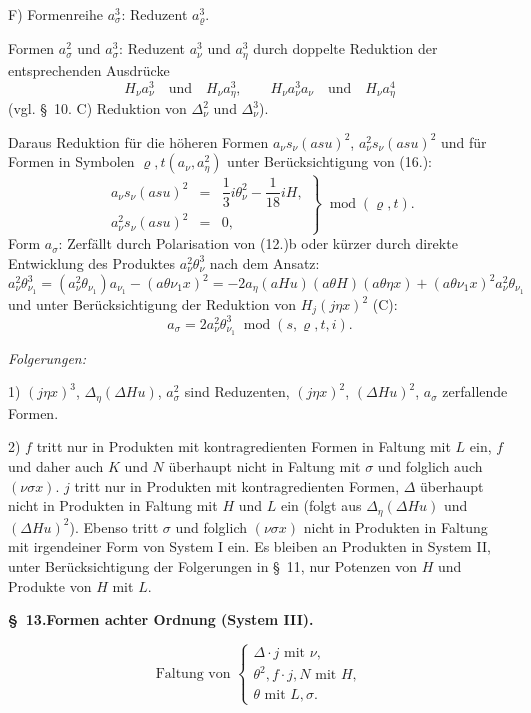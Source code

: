 \documentclass[11pt]{article}
\newcommand{\A}{\Delta}
\newcommand{\R}{\varrho}
\newcommand{\modu}[1]{\;\operatorname{mod} #1}
\begin{document}
\noindent F) Formenreihe $a_\sigma^3$: Reduzent $a_\R^3$.

Formen $a_\sigma^2$ und $a_\sigma^3$: Reduzent $a_\nu^3$ und $a_\eta^3$ durch doppelte Reduktion der entsprechenden Ausdrücke
\[
H_\nu a_\nu^3\quad\text{und}\quad H_\nu a_\eta^3,
\qquad
H_\nu a_\nu^3a_\nu\quad\text{und}\quad H_\nu a_\eta^4
\]
(vgl. \S\ 10. C) Reduktion von $\A_\nu^2$ und $\A_\nu^3$).

Daraus Reduktion für die höheren Formen $a_\nu s_\nu(asu)^2$, $a_\nu^2s_\nu(asu)^2$ und für Formen in Symbolen $\R,t(a_\nu,a_\eta^2)$ unter Berücksichtigung von (16.):
\[
\tag{19}
\left.\begin{array}{rcl}
a_\nu s_\nu(asu)^2&=&\dfrac13 i\theta_\nu^2-\dfrac1{18}iH,\\[0.5em]
a_\nu^2s_\nu(asu)^2&=&0,
\end{array}\right\}\modu{(\R,t)}.
\]
Form $a_\sigma$: Zerfällt durch Polarisation von (12.)b oder kürzer durch direkte Entwicklung des Produktes $a_\nu^2\theta_\nu^3$ nach dem Ansatz:
\[
a_\nu^2\theta_{\nu_1}^3=(a_\nu^2\theta_{\nu_1})a_{\nu_1}-(a\theta\nu_1x)^2
=-2a_\eta(aHu)(a\theta H)(a\theta\eta x)+(a\theta\nu_1x)^2a_\nu^2\theta_{\nu_1}
\]
und unter Berücksichtigung der Reduktion von $H_j(j\eta x)^2$ (C):
\[
\tag{20}a_\sigma=2a_\nu^2\theta_{\nu_1}^3\modu{(s,\R,t,i)}.
\]

\noindent\emph{Folgerungen:}

1) $(j\eta x)^3$, $\A_\eta(\A Hu)$, $a_\sigma^2$ sind Reduzenten, $(j\eta x)^2$, $(\A Hu)^2$, $a_\sigma$ zerfallende Formen.

2) $f$ tritt nur in Produkten mit kontragredienten Formen in Faltung mit $L$ ein, $f$ und daher auch $K$ und $N$ überhaupt nicht in Faltung mit $\sigma$ und folglich auch $(\nu\sigma x)$. $j$ tritt nur in Produkten mit kontragredienten Formen, $\A$ überhaupt nicht in Produkten in Faltung mit $H$ und $L$ ein (folgt aus $\A_\eta(\A Hu)$ und $(\A Hu)^2$). Ebenso tritt $\sigma$ und folglich $(\nu\sigma x)$ nicht in Produkten in Faltung mit irgendeiner Form von System I ein. Es bleiben an Produkten in System II, unter Berücksichtigung der Folgerungen in \S\ 11, nur Potenzen von $H$ und Produkte von $H$ mit $L$.

\begin{center}
\textbf{\S\ 13.\quad Formen achter Ordnung (System III).}
\end{center}
\[
\text{Faltung von }\left\{\begin{array}{l}
\A\cdot j\text{ mit }\nu,\\
\theta^2,
 f\cdot j,
 N\text{ mit }H,\\
\theta\text{ mit }L,\sigma.
\end{array}\right.
\]
\end{document}
